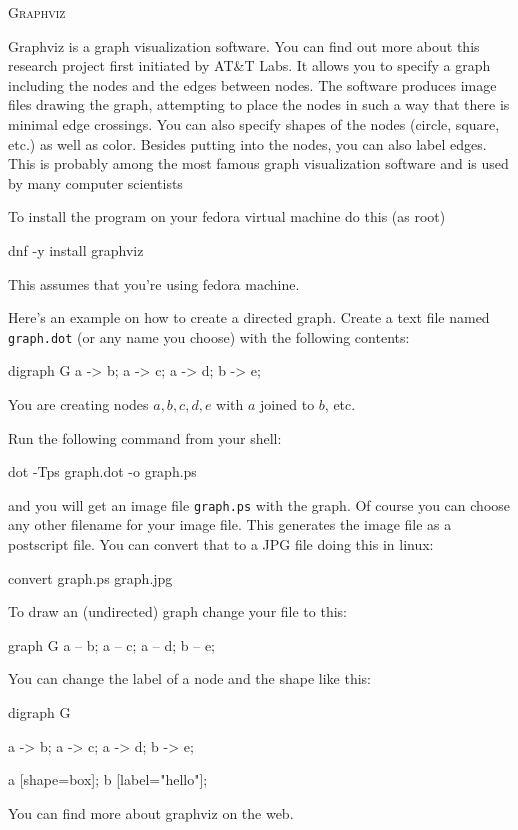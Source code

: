 \textsc{Graphviz}

Graphviz is a graph visualization software.
You can find out more about this research
project first initiated by AT\&T Labs.
It allows you to specify a graph including
the nodes 
and the edges between nodes.
The software produces image files drawing
the graph, attempting to place the nodes
in such a way that there is minimal edge crossings.
You can also specify shapes of the nodes (circle, square, etc.)
as well as color.
Besides putting into the nodes, you can also label edges.
This is probably among the most famous graph visualization software
and is used by many computer scientists

To install the program on your fedora virtual machine do this
(as root)
\begin{console}[fontsize=\footnotesize]
dnf -y install graphviz
\end{console}
This assumes that you're using  fedora machine.

Here's an example on how to create a directed graph.
Create a text file named \verb!graph.dot! (or any name you choose)
with the following contents:
\begin{console}[fontsize=\footnotesize]
digraph G
{
   a -> b;
   a -> c;
   a -> d;
   b -> e;
}
\end{console}
You are creating nodes $a, b, c, d, e$ with $a$ joined to $b$, etc.

Run the following command from your shell:
\begin{console}[fontsize=\footnotesize]
dot -Tps graph.dot -o graph.ps
\end{console}
and you will get an image file \verb!graph.ps! with the graph.
Of course you can choose any other filename for your image file. 
This generates the image file as a postscript file.
You can convert that to a JPG file doing this in linux:
\begin{console}
convert graph.ps graph.jpg
\end{console}
To draw an (undirected)  graph change your file to this:
\begin{console}[fontsize=\footnotesize]
graph G
{
   a -- b;
   a -- c;
   a -- d;
   b -- e;
}
\end{console}

You can change the label of a node and the shape like this:
\begin{console}[fontsize=\footnotesize]
digraph G
{
   a -> b;
   a -> c;
   a -> d;
   b -> e;

   a [shape=box];
   b [label="hello\nworld"];
}
\end{console}

You can find more about graphviz on the web.
